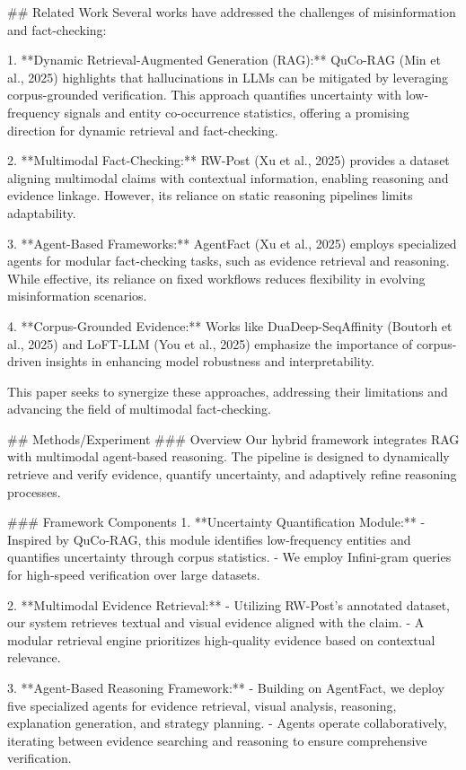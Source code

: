 ## Related Work  
Several works have addressed the challenges of misinformation and fact-checking:  

1. **Dynamic Retrieval-Augmented Generation (RAG):** QuCo-RAG (Min et al., 2025) highlights that hallucinations in LLMs can be mitigated by leveraging corpus-grounded verification. This approach quantifies uncertainty with low-frequency signals and entity co-occurrence statistics, offering a promising direction for dynamic retrieval and fact-checking.  

2. **Multimodal Fact-Checking:** RW-Post (Xu et al., 2025) provides a dataset aligning multimodal claims with contextual information, enabling reasoning and evidence linkage. However, its reliance on static reasoning pipelines limits adaptability.  

3. **Agent-Based Frameworks:** AgentFact (Xu et al., 2025) employs specialized agents for modular fact-checking tasks, such as evidence retrieval and reasoning. While effective, its reliance on fixed workflows reduces flexibility in evolving misinformation scenarios.  

4. **Corpus-Grounded Evidence:** Works like DuaDeep-SeqAffinity (Boutorh et al., 2025) and LoFT-LLM (You et al., 2025) emphasize the importance of corpus-driven insights in enhancing model robustness and interpretability.  

This paper seeks to synergize these approaches, addressing their limitations and advancing the field of multimodal fact-checking.  

## Methods/Experiment  
### Overview  
Our hybrid framework integrates RAG with multimodal agent-based reasoning. The pipeline is designed to dynamically retrieve and verify evidence, quantify uncertainty, and adaptively refine reasoning processes.  

### Framework Components  
1. **Uncertainty Quantification Module:**  
   - Inspired by QuCo-RAG, this module identifies low-frequency entities and quantifies uncertainty through corpus statistics.  
   - We employ Infini-gram queries for high-speed verification over large datasets.  

2. **Multimodal Evidence Retrieval:**  
   - Utilizing RW-Post's annotated dataset, our system retrieves textual and visual evidence aligned with the claim.  
   - A modular retrieval engine prioritizes high-quality evidence based on contextual relevance.  

3. **Agent-Based Reasoning Framework:**  
   - Building on AgentFact, we deploy five specialized agents for evidence retrieval, visual analysis, reasoning, explanation generation, and strategy planning.  
   - Agents operate collaboratively, iterating between evidence searching and reasoning to ensure comprehensive verification.  

